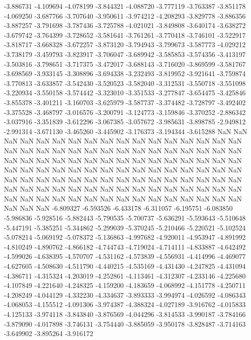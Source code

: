 -3.886731
-4.109694
-4.078199
-3.844321
-4.088720
-3.777119
-3.763387
-3.851178
-4.069250
-3.687766
-3.707640
-3.950611
-3.974212
-4.208293
-3.829778
-3.886356
-3.887257
-3.791698
-3.787436
-3.725788
-4.021021
-3.849808
-3.640174
-3.638272
-3.679742
-3.764399
-3.728652
-3.581641
-3.761261
-3.770418
-3.746101
-3.522917
-3.818717
-3.668328
-3.672257
-3.873120
-3.794943
-3.799673
-3.587773
-4.029212
-3.738179
-3.459793
-3.823917
-3.706047
-3.689942
-3.585853
-3.574356
-3.413197
-3.503816
-3.798651
-3.717375
-3.472017
-3.688143
-3.716020
-3.869599
-3.581767
-3.698569
-3.933145
-3.308896
-3.694338
-3.232493
-3.819952
-3.921641
-3.759874
-3.770813
-3.633857
-3.542430
-3.520523
-3.582040
-3.312531
-3.550718
-3.551098
-3.220934
-3.550158
-3.574442
-3.323010
-3.351533
-3.277847
-3.654475
-3.425846
-3.855378
-3.401211
-3.160703
-3.625979
-3.587737
-3.374482
-3.728797
-3.492402
-3.375528
-3.468797
-3.016576
-3.200791
-3.124773
-3.159846
-3.370252
-2.886342
-3.037916
-3.351839
-3.612296
-3.067385
-3.057672
-3.985631
-3.898785
-2.949812
-2.991314
-3.671130
-3.465260
-3.445902
-3.176373
-3.194344
-3.615288
NaN
NaN
NaN
NaN
NaN
NaN
NaN
NaN
NaN
NaN
NaN
NaN
NaN
NaN
NaN
NaN
NaN
NaN
NaN
NaN
NaN
NaN
NaN
NaN
NaN
NaN
NaN
NaN
NaN
NaN
NaN
NaN
NaN
NaN
NaN
NaN
NaN
NaN
NaN
NaN
NaN
NaN
NaN
NaN
NaN
NaN
NaN
NaN
NaN
NaN
NaN
NaN
NaN
NaN
NaN
NaN
NaN
NaN
NaN
NaN
NaN
NaN
NaN
NaN
NaN
NaN
NaN
NaN
NaN
NaN
NaN
NaN
NaN
NaN
NaN
NaN
NaN
NaN
NaN
NaN
NaN
NaN
NaN
NaN
NaN
NaN
NaN
NaN
NaN
NaN
NaN
NaN
NaN
NaN
NaN
NaN
NaN
NaN
NaN
NaN
NaN
NaN
NaN
NaN
NaN
NaN
NaN
NaN
NaN
NaN
-6.809327
-6.593526
-6.433178
-6.311057
-6.195751
-6.083850
-5.986836
-5.928516
-5.882443
-5.790535
-5.700737
-5.636291
-5.593643
-5.510648
-5.447191
-5.385251
-5.344862
-5.299039
-5.370245
-5.210466
-5.220521
-5.102524
-5.078214
-5.069192
-5.078372
-5.136863
-4.997682
-4.920011
-4.953947
-4.891992
-4.810249
-4.890762
-4.866182
-4.744743
-4.719024
-4.714111
-4.833887
-4.642492
-4.599026
-4.638395
-4.570707
-4.531162
-4.573839
-4.556931
-4.414996
-4.469077
-4.627605
-4.508630
-4.511790
-4.440215
-4.535169
-4.431430
-4.247825
-4.431094
-4.386711
-4.315324
-4.203019
-4.252861
-4.113461
-4.312307
-4.233146
-4.225680
-4.107849
-4.221640
-4.248325
-4.159200
-4.183659
-4.068992
-4.151778
-4.250711
-4.208249
-4.044129
-4.332230
-4.334637
-3.893333
-3.994974
-4.026592
-4.086343
-4.068053
-4.155512
-4.091306
-3.974387
-4.388324
-4.027189
-3.916762
-4.015833
-4.125133
-3.974118
-3.843840
-3.876569
-4.044296
-3.814533
-3.990187
-3.784166
-3.879090
-4.017898
-3.746131
-3.754440
-3.885059
-3.950178
-3.828487
-3.714163
-3.649902
-3.895264
-3.916172
